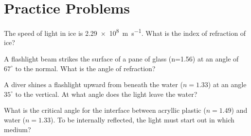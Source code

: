 \documentclass[10pt]{exam}
\begin{document}
\pagebreak

\section*{Practice Problems}

\begin{questions}
  \question 
    The speed of light in ice is \SI{2.29e8}{\meter\per\second}.  What is the index of refraction of ice?
    \vs

  \question
    A flashlight beam strikes the surface of a pane of glass (n=1.56) at an angle of $67^\circ$ to the normal.  What is the angle of refraction?
    \vs

  \question
    A diver shines a flashlight upward from beneath the water ($n=1.33$) at an angle $35^\circ$ to the vertical.  At what angle does the light leave the water?
    \vs

  \question
    What is the critical angle for the interface between acryllic plastic ($n=1.49$) and water ($n=1.33$).  To be internally reflected, the light must start out in which medium?
    \vs
 
\end{questions}
\end{document}
